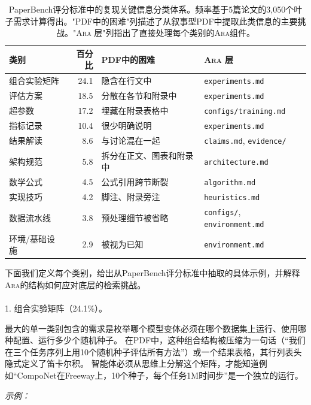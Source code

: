 \documentclass[
]{article}
\makeatletter
\let\oldparagraph\paragraph
\renewcommand{\paragraph}{
    \@ifstar
      \xxxParagraphStar
      \xxxParagraphNoStar
  }
\newcommand{\xxxParagraphStar}[1]{\oldparagraph*{#1}\mbox{}}
\newcommand{\xxxParagraphNoStar}[1]{\oldparagraph{#1}\mbox{}}
\theoremstyle{definition}
\newcommand{\ara}{\textsc{Ara}}
\makeatother
\begin{document}
\begin{table}[h]
\centering
\small
\begin{tabular}{p{3.2cm}rp{3.6cm}l}
\toprule
\textbf{类别} & \textbf{百分比} & \textbf{PDF中的困难} & \textbf{\ara{} 层} \\
\midrule
组合实验矩阵 & 24.1 & 隐含在行文中 & \texttt{experiments.md} \\
评估方案 & 18.5 & 分散在各节和附录中 & \texttt{experiments.md} \\
超参数 & 17.2 & 埋藏在附录表格中 & \texttt{configs/training.md} \\
指标记录 & 10.4 & 很少明确说明 & \texttt{experiments.md} \\
结果解读 & 8.6 & 与讨论混在一起 & \texttt{claims.md}, \texttt{evidence/} \\
架构规范 & 5.8 & 拆分在正文、图表和附录中 & \texttt{architecture.md} \\
数学公式 & 4.5 & 公式引用跨节断裂 & \texttt{algorithm.md} \\
实现技巧 & 4.2 & 脚注、附录旁注 & \texttt{heuristics.md} \\
数据流水线 & 3.8 & 预处理细节被省略 & \texttt{configs/}, \texttt{environment.md} \\
环境/基础设施 & 2.9 & 被视为已知 & \texttt{environment.md} \\
\bottomrule
\end{tabular}
\caption{PaperBench评分标准中的复现关键信息分类体系。频率基于5篇论文的3{,}050个叶子需求计算得出。"PDF中的困难"列描述了从叙事型PDF中提取此类信息的主要挑战。"\ara{} 层"列指出了直接处理每个类别的\ara{}组件。}
\label{tab-taxonomy}
\end{table}

下面我们定义每个类别，给出从PaperBench评分标准中抽取的具体示例，并解释\ara{}的结构如何应对底层的检索挑战。

\paragraph{1.
组合实验矩阵（24.1\%）。}\label{ux7ec4ux5408ux5b9eux9a8cux77e9ux963524.1}

最大的单一类别包含的需求是枚举哪个模型变体必须在哪个数据集上运行、使用哪种配置、运行多少个随机种子。
在PDF中，这种组合结构被压缩为一句话（``我们在三个任务序列上用10个随机种子评估所有方法''）或一个结果表格，其行列表头隐式定义了笛卡尔积。
智能体必须从思维上分解这个矩阵，才能知道例如``CompoNet在Freeway上，10个种子，每个任务1M时间步''是一个独立的运行。

\emph{示例：}
\end{document}

